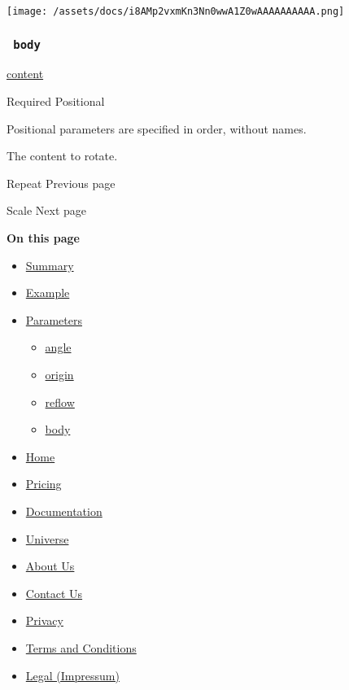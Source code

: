 \texttt{[image: /assets/docs/i8AMp2vxmKn3Nn0wwA1Z0wAAAAAAAAAA.png]}

\subsubsection{\texorpdfstring{\texttt{\ body\ }}{ body }}\label{parameters-body}

\href{/docs/reference/foundations/content/}{content}

{Required} {{ Positional }}

\label{parameters-body-positional-tooltip}
Positional parameters are specified in order, without names.

The content to rotate.

\href{/docs/reference/layout/repeat/}{\pandocbounded{}}

{ Repeat } { Previous page }

\href{/docs/reference/layout/scale/}{\pandocbounded{}}

{ Scale } { Next page }

\textbf{On this page}

\begin{itemize}
\tightlist
\item
  \hyperref[summary]{Summary}
\item
  \hyperref[example]{Example}
\item
  \hyperref[parameters]{Parameters}

  \begin{itemize}
  \tightlist
  \item
    \hyperref[parameters-angle]{angle}
  \item
    \hyperref[parameters-origin]{origin}
  \item
    \hyperref[parameters-reflow]{reflow}
  \item
    \hyperref[parameters-body]{body}
  \end{itemize}
\end{itemize}

\begin{itemize}
\tightlist
\item
  \href{/}{Home}
\item
  \href{/pricing/}{Pricing}
\item
  \href{/docs/}{Documentation}
\item
  \href{/universe/}{Universe}
\item
  \href{/about/}{About Us}
\item
  \href{/contact/}{Contact Us}
\item
  \href{/privacy/}{Privacy}
\item
  \href{https://typst.app/terms}{Terms and Conditions}
\item
  \href{/legal/}{Legal (Impressum)}
\end{itemize}

